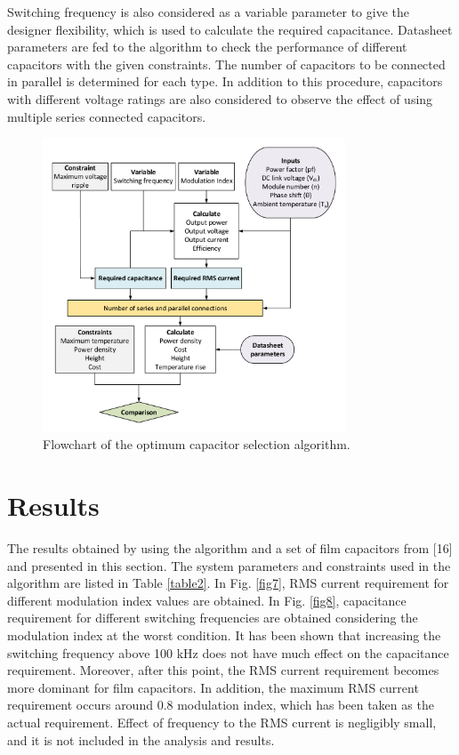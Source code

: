 \documentclass[conference,a4paper,twocolumn]{IEEEtran}
\begin{document}
Switching frequency is also considered as a variable parameter to give the designer flexibility, which is used to calculate the required capacitance. Datasheet parameters are fed to the algorithm to check the performance of different capacitors with the given constraints. The number of capacitors to be connected in parallel is determined for each type. In addition to this procedure, capacitors with different voltage ratings are also considered to observe the effect of using multiple series connected capacitors.



\begin{figure}[h]
  \centering
  \includegraphics[width=9cm]{fig6}
  \caption{Flowchart of the optimum capacitor selection algorithm.}
  \label{fig6}
\end{figure}



\section{Results}

The results obtained by using the algorithm and a set of film capacitors from [16] and presented in this section. The system parameters and constraints used in the algorithm are listed in Table \ref{table2}. In Fig. \ref{fig7}, RMS current requirement for different modulation index values are obtained. In Fig. \ref{fig8}, capacitance requirement for different switching frequencies are obtained considering the modulation index at the worst condition. It has been shown that increasing the switching frequency above 100 kHz does not have much effect on the capacitance requirement. Moreover, after this point, the RMS current requirement becomes more dominant for film capacitors. In addition, the maximum RMS current requirement occurs around 0.8 modulation index, which has been taken as the actual requirement. Effect of frequency to the RMS current is negligibly small, and it is not included in the analysis and results.
\end{document}
